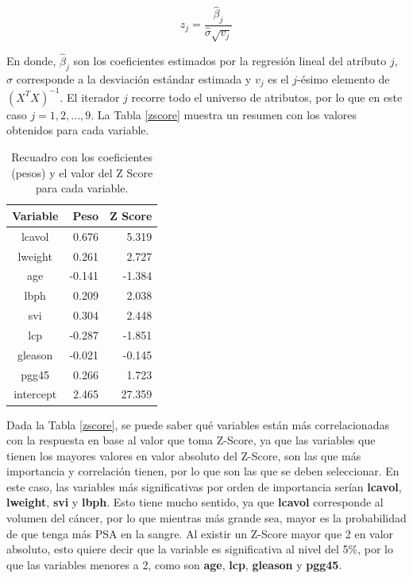 \documentclass[letter, 10pt]{article}
\begin{document}
\begin{equation}
z_j=\frac{\hat{\beta }_j}{\hat{\sigma }\sqrt{v_j}}
\end{equation}

En donde, $\hat{\beta }_j$ son los coeficientes estimados por la regresión lineal del atributo $j$, $\hat{\sigma }$ corresponde a la desviación estándar estimada y $v_j$ es el $j$-ésimo elemento de $\left ( X^{T}X \right )^{-1}$. El iterador $j$ recorre todo el universo de atributos, por lo que en este caso $j=1,2,...,9$. La Tabla \ref{zscore} muestra un resumen con los valores obtenidos para cada variable.

\begin{table}[!hbt] 
\begin{center}
\begin{tabular}{| c | r | r |} 
\hline
\textbf{Variable} & \textbf{Peso} & \textbf{Z Score}\\ 
\hline 
lcavol & 0.676 & 5.319\\ 
lweight &0.261 & 2.727\\
age &-0.141 & -1.384\\
lbph &0.209 & 2.038\\
svi & 0.304& 2.448\\
lcp & -0.287& -1.851\\
gleason & -0.021& -0.145\\
pgg45 &0.266 &  1.723\\
intercept &2.465 & 27.359\\
\hline 
\end{tabular}
\caption{Recuadro con los coeficientes (pesos) y el valor del Z Score para cada variable.} 
\label{table:zscore}
\end{center} 
\end{table}

Dada la Tabla \ref{zscore}, se puede saber qué variables están más correlacionadas con la respuesta en base al valor que toma Z-Score, ya que las variables que tienen los mayores valores en valor absoluto del Z-Score, son las que más importancia y correlación tienen, por lo que son las que se deben seleccionar. En este caso, las variables más significativas por orden de importancia serían \textbf{lcavol}, \textbf{lweight}, \textbf{svi} y \textbf{lbph}. Esto tiene mucho sentido, ya que \textbf{lcavol} corresponde al volumen del cáncer, por lo que mientras más grande sea, mayor es la probabilidad de que tenga más PSA en la sangre. Al existir un Z-Score mayor que 2 en valor absoluto, esto quiere decir que la variable es significativa al nivel del 5\%, por lo que las variables menores a 2, como son \textbf{age}, \textbf{lcp}, \textbf{gleason} y \textbf{pgg45}.\\
\end{document}
